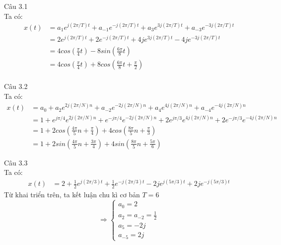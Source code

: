 \documentclass[11pt]{exam}
\begin{document}
\begin{questions}
\question Câu 3.1 \\
    Ta có:
    \begin{equation*}
        \begin{aligned}
            x(t) &= a_1e^{j(2\pi/T)t} + a_{-1}e^{-j(2\pi/T)t} + a_3e^{3j(2\pi/T)t} + a_{-3}e^{-3j(2\pi/T)t} \\
            &= 2e^{j(2\pi/T)t} + 2e^{-j(2\pi/T)t} + 4je^{3j(2\pi/T)t} - 4je^{-3j(2\pi/T)t}\\
            &= 4cos(\frac{\pi}{4}t)-8sin(\frac{6\pi}{8}t) \\
            &= 4cos(\frac{\pi}{4}t)+8cos(\frac{6\pi}{8}t + \frac{\pi}{2}) \\
        \end{aligned}
    \end{equation*}

\question Câu 3.2 \\
    Ta có:
    \begin{equation*}
        \begin{aligned}
            x(t) &= a_0 + a_2e^{2j(2\pi/N)n} + a_{-2}e^{-2j(2\pi/N)n} + a_4e^{4j(2\pi/N)n} + a_{-4}e^{-4j(2\pi/N)n} \\
             &= 1 + e^{j\pi/4}e^{2j(2\pi/N)n} + e^{-j\pi/4}e^{-2j(2\pi/N)n} + 2e^{j\pi/3}e^{4j(2\pi/N)n} + 2e^{-j\pi/3}e^{-4j(2\pi/N)n} \\
            &= 1 + 2cos(\frac{4\pi}{5}n+\frac{\pi}{4}) + 4cos(\frac{8\pi}{5}n+\frac{\pi}{3}) \\
            &= 1 + 2sin(\frac{4\pi}{5}n+\frac{3\pi}{4}) + 4sin(\frac{8\pi}{5}n+\frac{5\pi}{6})
        \end{aligned}        
    \end{equation*}

\question Câu 3.3 \\
    Ta có:
    \begin{equation*}
        \begin{aligned}
            x(t) &= 2 + \frac{1}{2}e^{j(2\pi/3)t} + \frac{1}{2}e^{-j(2\pi/3)t} - 2je^{j(5\pi/3)t} + 2je^{-j(5\pi/3)t}
        \end{aligned}
    \end{equation*}
    Từ khai triển trên, ta kết luận chu kì cơ bản $T = 6$
    \begin{equation*}
        \Rightarrow \begin{cases}
            a_0 = 2 \\
            a_2 = a_{-2} = \frac{1}{2} \\
            a_5 = -2j \\
            a_{-5} = 2j
        \end{cases}
    \end{equation*}


\end{questions}
\end{document}
